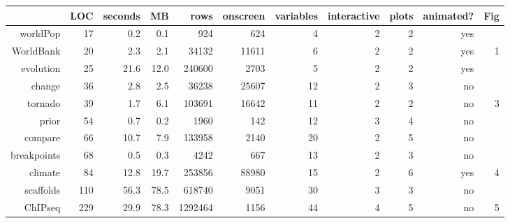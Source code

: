 \begin{tabular}{rrrrrrrrrrr}
  \hline
 & LOC & seconds & MB & rows & onscreen & variables & interactive & plots & animated? & Fig \\ 
  \hline
worldPop & 17 & 0.2 & 0.1 & 924 & 624 &  4 &  2 &  2 & yes &  \\ 
  WorldBank & 20 & 2.3 & 2.1 & 34132 & 11611 &  6 &  2 &  2 & yes &  1 \\ 
  evolution & 25 & 21.6 & 12.0 & 240600 & 2703 &  5 &  2 &  2 & yes &  \\ 
  change & 36 & 2.8 & 2.5 & 36238 & 25607 & 12 &  2 &  3 & no &  \\ 
  tornado & 39 & 1.7 & 6.1 & 103691 & 16642 & 11 &  2 &  2 & no &  3 \\ 
  prior & 54 & 0.7 & 0.2 & 1960 & 142 & 12 &  3 &  4 & no &  \\ 
  compare & 66 & 10.7 & 7.9 & 133958 & 2140 & 20 &  2 &  5 & no &  \\ 
  breakpoints & 68 & 0.5 & 0.3 & 4242 & 667 & 13 &  2 &  3 & no &  \\ 
  climate & 84 & 12.8 & 19.7 & 253856 & 88980 & 15 &  2 &  6 & yes &  4 \\ 
  scaffolds & 110 & 56.3 & 78.5 & 618740 & 9051 & 30 &  3 &  3 & no &  \\ 
  ChIPseq & 229 & 29.9 & 78.3 & 1292464 & 1156 & 44 &  4 &  5 & no &  5 \\ 
   \hline
\end{tabular}
